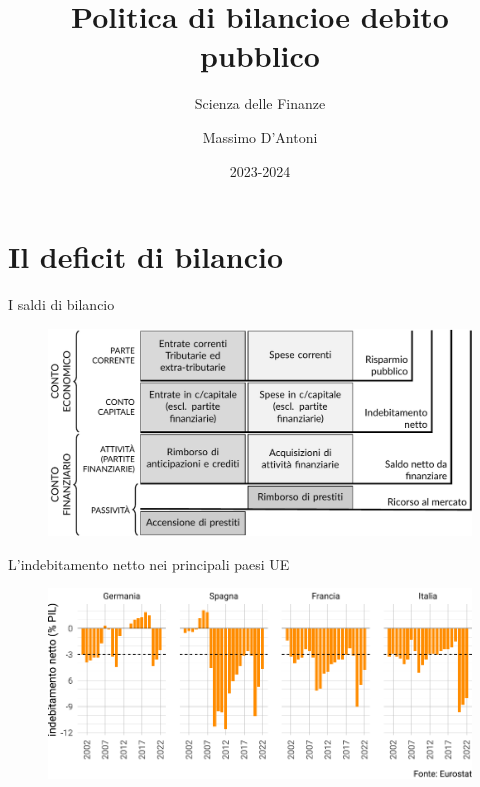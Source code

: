 \documentclass[aspectratio=64,11pt]{beamer}
\institute{Università di Siena}
\author{Massimo D'Antoni}
\date{2023-2024}
\title{Politica di bilancio\newline e debito pubblico}
\subtitle{Scienza delle Finanze}
\begin{document}
\maketitle

\section{Il deficit di bilancio}

\begin{frame}{I saldi di bilancio}
  \begin{figure}
    \centering
    \includegraphics[width=12cm]{./figure/saldi-di-bilancio.pdf}
  \end{figure}
\end{frame}

\begin{frame}{L'indebitamento netto nei principali paesi UE}
  \begin{figure}
    \centering
    \includegraphics[width=\textwidth]{./figure/deficit-4countries-2000-2022-color.pdf}
  \end{figure}
\end{frame}
\end{document}
